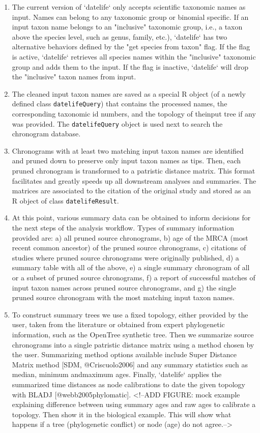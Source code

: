 \documentclass[
  english,
  man]{apa6}
\begin{document}
\begin{enumerate}
\item The current version of `datelife` only accepts scientific taxonomic names as input. Names can belong to any taxonomic group or binomial specific. If an input taxon name belongs to an "inclusive" taxonomic group, i.e., a taxon above the species level, such as genus, family, etc.), `datelife` has two alternative behaviors defined by the "get species from taxon" flag. If the flag is active, `datelife` retrieves all species names within the "inclusive" taxonomic group and adds them to the input. If the flag is inactive, `datelife` will drop the "inclusive" taxon names from input.
\item The cleaned input taxon names are saved as a special R object (of a newly defined class \texttt{datelifeQuery}) that contains the processed names, the corresponding taxonomic id numbers, and the topology of theinput tree if any was provided. The \texttt{datelifeQuery} object is used next to search the chronogram database.
\item Chronograms with at least two matching input taxon names are identified and pruned down to preserve only input taxon names as tips.
Then, each pruned chronogram is transformed to a patristic distance matrix. This format facilitates and greatly speeds up all downstream analyses and summaries. The matrices are associated to the citation of the original study and stored as an R object of class \texttt{datelifeResult}.
\item  At this point, various summary data can be obtained to inform decisions for the next steps of the analysis workflow. Types of summary information provided are: a) all pruned source chronograms, b) age of the MRCA (most recent common ancestor) of the pruned source chronograms, c) citations of studies where pruned source chronograms were originally published, d) a summary table with all of the above, e) a single summary chronogram of all or a subset of pruned source chronograms, f) a report of successful matches of input taxon names across pruned source chronograms, and g) the single pruned source chronogram with the most matching input taxon names.
\item To construct summary trees we use a fixed topology, either provided by the user, taken from the literature or obtained from expert
phylogenetic information, such as the OpenTree synthetic tree. Then we summarize source chronograms into a single patristic distance matrix using a method chosen by the user. Summarizing method options available include Super Distance Matrix method [SDM, @Criscuolo2006] and any summary statistics such as median, minimum andmaximum ages. Finally, `datelife` applies the summarized time distances as node calibrations to date the given topology with BLADJ [@webb2005phylomatic].
<!--ADD FIGURE: mock example explaining difference between using summary ages and raw ages to calibrate a topology. Then show it in the biological example. This will show what happens if a tree (phylogenetic conflict) or node (age) do not agree.-->


\end{enumerate}
\end{document}
